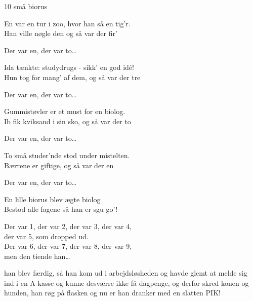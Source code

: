 \begin{song}{10 små biorus}{}
  \begin{SBVerse}
  En var en tur i zoo, hvor han så en tig’r.\\
  Han ville nøgle den og så var der fir’
  \end{SBVerse}
  \begin{SBChorus}
  Der var en, der var to\ldots
  \end{SBChorus}

  \begin{SBVerse}
  Ida tænkte: studydrugs - sikk’ en god idé!\\
  Hun tog for mang' af dem, og så var der tre
  \end{SBVerse}
  \begin{SBChorus}
  Der var en, der var to\ldots
  \end{SBChorus}

  \begin{SBVerse}
  Gummistøvler er et must for en biolog.\\
  Ib fik kviksand i sin sko, og så var der to
  \end{SBVerse}
  \begin{SBChorus}
  Der var en, der var to\ldots
  \end{SBChorus}

  \begin{SBVerse}
  To små studer'nde stod under mistelten.\\
  Bærrene er giftige, og så var der en
  \end{SBVerse}
  \begin{SBChorus}
  Der var en, der var to\ldots
  \end{SBChorus}

  \begin{SBVerse}
  En lille biorus blev ægte biolog\\
  Bestod alle fagene så han er sgu go'!
  \end{SBVerse}
  \begin{SBChorus}
  Der var 1, der var 2, der var 3, der var 4,\\
  der var 5, som dropped ud.\\
  Der var 6, der var 7, der var 8, der var 9,\\
  men den tiende han\ldots
  \end{SBChorus}

  han blev færdig, så han kom ud i arbejdsløsheden og havde glemt at melde sig ind i en A-kasse og kunne desværre ikke få dagpenge, og derfor skred konen og hunden, han røg på flasken og nu er han dranker med en slatten PIK!

\end{song}